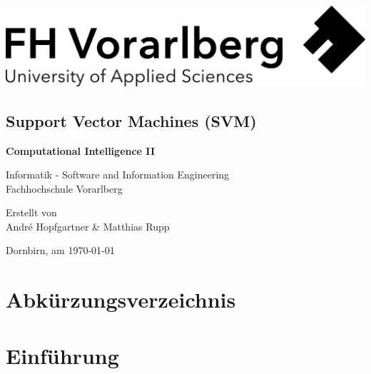 \documentclass[a4paper,11pt,twoside]{scrreprt}
\begin{document}
\cleardoublepage   %
\thispagestyle{empty}
\begin{titlepage}
  \begin{flushright}
  \includegraphics[width=0.4\linewidth]{assets/Logo-A3.jpg}
  \end{flushright}
  \begin{center}
  \section*{Support Vector Machines (SVM)}
  \vspace{2cm}

\textbf{Computational Intelligence II}    
\vspace{0.5cm}

  Informatik - Software and Information Engineering\\
  Fachhochschule Vorarlberg\\

  \vspace{1cm}
  
    Erstellt von\\
  André Hopfgartner \& Matthias Rupp\\
  
 
  \vspace{1cm}
  

  
  Dornbirn, am \today
  
  
  \end{center}
\end{titlepage}


\clearpage   %
\setcounter{tocdepth}{2}
\setcounter{secnumdepth}{4}
\tableofcontents

\clearpage
{}
{}
\chapter*{Abkürzungsverzeichnis}
\begin{acronym}
\end{acronym}



\chapter{Einführung}
\end{document}
